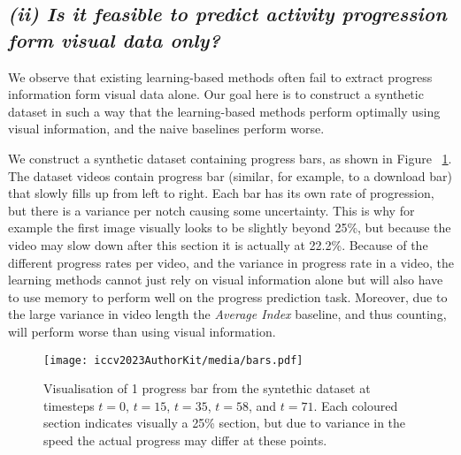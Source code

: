 \subsection{\emph{\textbf{(ii) Is it feasible to predict activity progression form visual data only?}}}
We observe that existing learning-based methods often fail to extract progress information form visual data alone. Our goal here is to construct a synthetic dataset in such a way that the learning-based methods perform optimally using visual information, and the naive baselines perform worse.

We construct a synthetic dataset containing progress bars, as shown in Figure ~\ref{fig:progressbars}. The dataset videos contain progress bar (similar, for example, to a download bar) that slowly fills up from left to right. Each bar has its own rate of progression, but there is a variance per notch causing some uncertainty. This is why for example the first image visually looks to be slightly beyond 25\%, but because the video may slow down after this section it is actually at 22.2\%. Because of the different progress rates per video, and the variance in progress rate in a video, the learning methods cannot just rely on visual information alone but will also have to use memory to perform well on the progress prediction task. Moreover, due to the large variance in video length the \textsl{Average Index} baseline, and thus counting, will perform worse than using visual information.




\begin{figure}[t]
\begin{center}
   \texttt{[image: iccv2023AuthorKit/media/bars.pdf]}
\end{center}
   \caption{Visualisation of 1 progress bar from the syntethic dataset at timesteps $t=0$, $t=15$, $t=35$, $t=58$, and $t=71$. Each coloured section indicates visually a 25\% section, but due to variance in the speed the actual progress may differ at these points.
   }
\label{fig:progressbars}
\end{figure}

